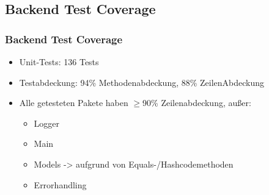 \subsection*{Backend Test Coverage}

\begin{frame}\frametitle{Backend Test Coverage}
    \begin{itemize}
        \item Unit-Tests: 136 Tests
        \item Testabdeckung: 94\% Methodenabdeckung, 88\% ZeilenAbdeckung
        \item Alle getesteten Pakete haben $\geq$90\% Zeilenabdeckung, außer: 
        \begin{itemize}
            \item Logger
            \item Main
            \item Models -> aufgrund von Equals-/Hashcodemethoden 
            \item Errorhandling
        \end{itemize}
    \end{itemize}
\end{frame}